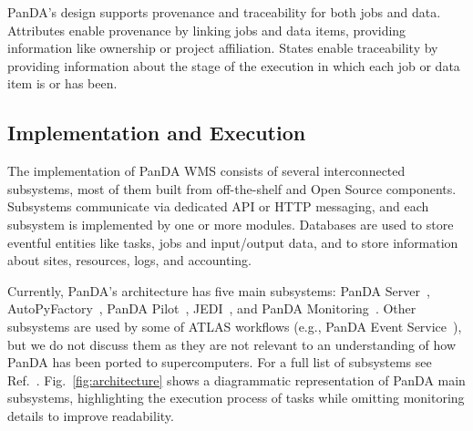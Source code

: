 \documentclass[conference]{IEEEtran}
\begin{document}
PanDA's design supports provenance and traceability for both jobs and data.
Attributes enable provenance by linking jobs and data items, providing
information like ownership or project affiliation. States enable traceability by
providing information about the stage of the execution in which each job or data
item is or has been.


\subsection{Implementation and Execution}
\label{ssec:panda_arch}

The implementation of PanDA WMS consists of several interconnected subsystems,
most of them built from off-the-shelf and Open Source components. Subsystems
communicate via dedicated API or HTTP messaging, and each subsystem is
implemented by one or more modules. Databases are used to store eventful
entities  like tasks, jobs and  input/output data, and to store information
about sites, resources, logs, and accounting.

Currently, PanDA's architecture has five main subsystems: PanDA
Server~\cite{maeno2011overview},
AutoPyFactory~\cite{caballero2012autopyfactory}, PanDA
Pilot~\cite{nilsson2011atlas}, JEDI~\cite{borodin2015scaling}, and PanDA
Monitoring~\cite{klimentov2011atlas}. Other subsystems are used by some of ATLAS
workflows (e.g., PanDA Event Service~\cite{calafiura2015atlas}), but we do not
discuss them as they are  not relevant to an understanding of how PanDA has been
ported to supercomputers. For a full list of subsystems see
Ref.~\cite{panda-wiki_url}. Fig.~\ref{fig:architecture} shows a diagrammatic
representation of PanDA main subsystems, highlighting the execution process of
tasks while omitting monitoring details to improve readability.
\end{document}

